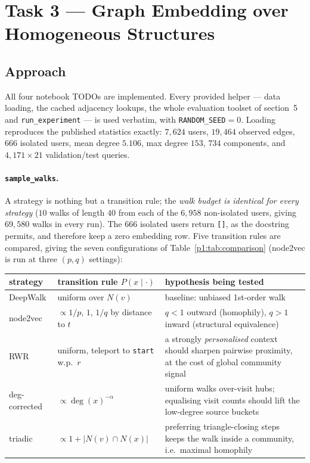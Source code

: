 \section{Task 3 --- Graph Embedding over Homogeneous Structures}
\label{p1:sec:main}

\subsection{Approach}
\label{p1:sec:approach}

All four notebook TODOs are implemented.  Every provided helper --- data loading, the
cached adjacency lookups, the whole evaluation toolset of section~5 and
\texttt{run\_experiment} --- is used verbatim, with \texttt{RANDOM\_SEED}${}=0$.
Loading reproduces the published statistics exactly:
$7{,}624$ users, $19{,}464$ observed edges, $666$ isolated users, mean degree $5.106$,
max degree $153$, $734$ components, and $4{,}171\times 21$ validation/test queries.

\paragraph{\texttt{sample\_walks}.}
A strategy is nothing but a transition rule; the \emph{walk budget is identical for every
strategy} ($10$ walks of length $40$ from each of the $6{,}958$ non-isolated users, giving
$69{,}580$ walks in every run).  The $666$ isolated users return \texttt{[]}, as the
docstring permits, and therefore keep a zero embedding row.  Five transition rules are
compared, giving the seven configurations of Table~\ref{p1:tab:comparison} (node2vec is
run at three $(p,q)$ settings):

\begin{center}\small
\begin{tabular}{@{}llp{6.6cm}@{}}
\toprule
strategy & transition rule $P(x \mid \cdot)$ & hypothesis being tested \\
\midrule
DeepWalk & uniform over $N(v)$ & baseline: unbiased 1st-order walk \\
node2vec & $\propto 1/p,\,1,\,1/q$ by distance to $t$ & $q<1$ outward (homophily), $q>1$ inward (structural equivalence) \\
RWR & uniform, teleport to \texttt{start} w.p.\ $r$ & a strongly \emph{personalised} context should sharpen pairwise proximity, at the cost of global community signal \\
deg-corrected & $\propto \deg(x)^{-\alpha}$ & uniform walks over-visit hubs; equalising visit counts should lift the low-degree source buckets \\
triadic & $\propto 1 + |N(v)\cap N(x)|$ & preferring triangle-closing steps keeps the walk inside a community, i.e.\ maximal homophily \\
\bottomrule
\end{tabular}
\end{center}

